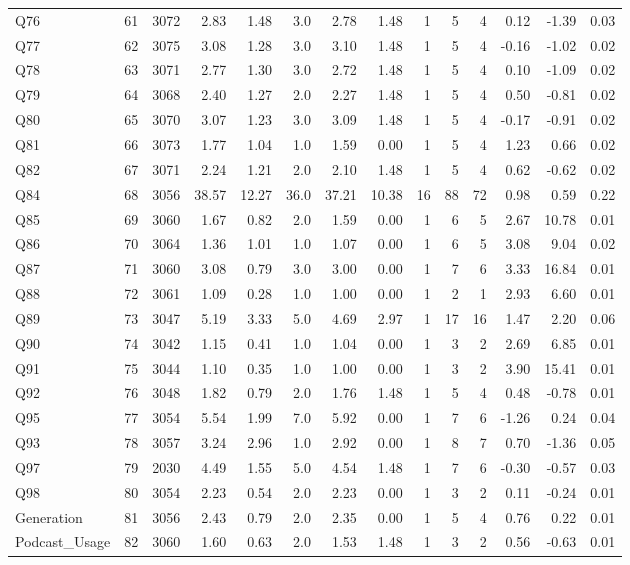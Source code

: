 \documentclass[
]{report}
\begin{document}
\begin{table}
\begin{tabular}[t]{lrrrrrrrrrrrrr}
\addlinespace
Q76 & 61 & 3072 & 2.83 & 1.48 & 3.0 & 2.78 & 1.48 & 1 & 5 & 4 & 0.12 & -1.39 & 0.03\\
Q77 & 62 & 3075 & 3.08 & 1.28 & 3.0 & 3.10 & 1.48 & 1 & 5 & 4 & -0.16 & -1.02 & 0.02\\
Q78 & 63 & 3071 & 2.77 & 1.30 & 3.0 & 2.72 & 1.48 & 1 & 5 & 4 & 0.10 & -1.09 & 0.02\\
Q79 & 64 & 3068 & 2.40 & 1.27 & 2.0 & 2.27 & 1.48 & 1 & 5 & 4 & 0.50 & -0.81 & 0.02\\
Q80 & 65 & 3070 & 3.07 & 1.23 & 3.0 & 3.09 & 1.48 & 1 & 5 & 4 & -0.17 & -0.91 & 0.02\\
\addlinespace
Q81 & 66 & 3073 & 1.77 & 1.04 & 1.0 & 1.59 & 0.00 & 1 & 5 & 4 & 1.23 & 0.66 & 0.02\\
Q82 & 67 & 3071 & 2.24 & 1.21 & 2.0 & 2.10 & 1.48 & 1 & 5 & 4 & 0.62 & -0.62 & 0.02\\
Q84 & 68 & 3056 & 38.57 & 12.27 & 36.0 & 37.21 & 10.38 & 16 & 88 & 72 & 0.98 & 0.59 & 0.22\\
Q85 & 69 & 3060 & 1.67 & 0.82 & 2.0 & 1.59 & 0.00 & 1 & 6 & 5 & 2.67 & 10.78 & 0.01\\
Q86 & 70 & 3064 & 1.36 & 1.01 & 1.0 & 1.07 & 0.00 & 1 & 6 & 5 & 3.08 & 9.04 & 0.02\\
\addlinespace
Q87 & 71 & 3060 & 3.08 & 0.79 & 3.0 & 3.00 & 0.00 & 1 & 7 & 6 & 3.33 & 16.84 & 0.01\\
Q88 & 72 & 3061 & 1.09 & 0.28 & 1.0 & 1.00 & 0.00 & 1 & 2 & 1 & 2.93 & 6.60 & 0.01\\
Q89 & 73 & 3047 & 5.19 & 3.33 & 5.0 & 4.69 & 2.97 & 1 & 17 & 16 & 1.47 & 2.20 & 0.06\\
Q90 & 74 & 3042 & 1.15 & 0.41 & 1.0 & 1.04 & 0.00 & 1 & 3 & 2 & 2.69 & 6.85 & 0.01\\
Q91 & 75 & 3044 & 1.10 & 0.35 & 1.0 & 1.00 & 0.00 & 1 & 3 & 2 & 3.90 & 15.41 & 0.01\\
\addlinespace
Q92 & 76 & 3048 & 1.82 & 0.79 & 2.0 & 1.76 & 1.48 & 1 & 5 & 4 & 0.48 & -0.78 & 0.01\\
Q95 & 77 & 3054 & 5.54 & 1.99 & 7.0 & 5.92 & 0.00 & 1 & 7 & 6 & -1.26 & 0.24 & 0.04\\
Q93 & 78 & 3057 & 3.24 & 2.96 & 1.0 & 2.92 & 0.00 & 1 & 8 & 7 & 0.70 & -1.36 & 0.05\\
Q97 & 79 & 2030 & 4.49 & 1.55 & 5.0 & 4.54 & 1.48 & 1 & 7 & 6 & -0.30 & -0.57 & 0.03\\
Q98 & 80 & 3054 & 2.23 & 0.54 & 2.0 & 2.23 & 0.00 & 1 & 3 & 2 & 0.11 & -0.24 & 0.01\\
\addlinespace
Generation & 81 & 3056 & 2.43 & 0.79 & 2.0 & 2.35 & 0.00 & 1 & 5 & 4 & 0.76 & 0.22 & 0.01\\
Podcast\_Usage & 82 & 3060 & 1.60 & 0.63 & 2.0 & 1.53 & 1.48 & 1 & 3 & 2 & 0.56 & -0.63 & 0.01\\
\bottomrule
\end{tabular}
\end{table}
\end{document}
